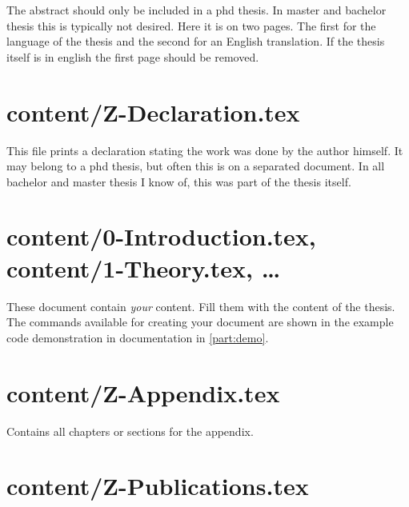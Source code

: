 The abstract should only be included in a phd thesis. In master and bachelor thesis this is typically not desired. Here it is on two pages. The first for the language of the thesis and the second for an English translation.
If the thesis itself is in english the first page should be removed.


\section{content/Z-Declaration.tex}

This file prints a declaration stating the work was done by the author himself.
It may belong to a phd thesis, but often this is on a separated document. In all bachelor and master thesis I know of, this was part of the thesis itself.



\section{content/0-Introduction.tex, content/1-Theory.tex, \ldots}

These document contain \emph{your} content. Fill them with the content of the thesis. The commands available for creating your document are shown in the example code demonstration in documentation in \cref{part:demo}.

\section{content/Z-Appendix.tex}

Contains all chapters or sections for the appendix.


\section{content/Z-Publications.tex}

